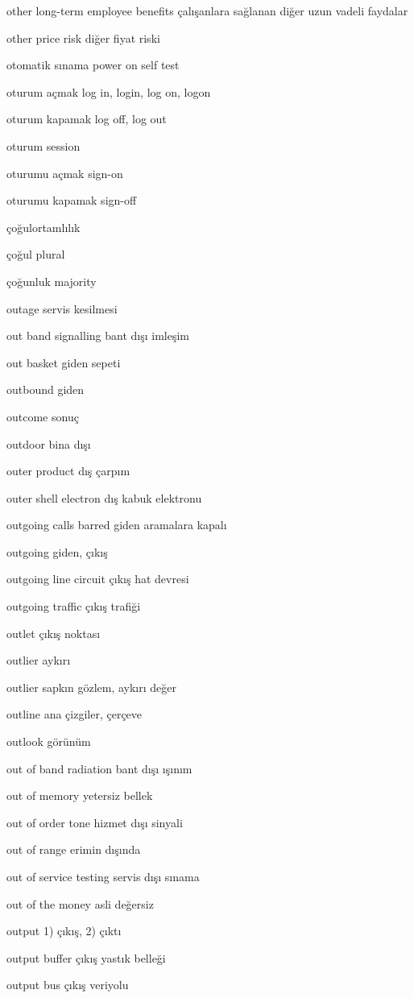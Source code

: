 \documentclass[12pt,fleqn]{article}\usepackage{../../common}
\begin{document}
other long-term employee benefits çalışanlara sağlanan diğer uzun vadeli faydalar

other price risk diğer fiyat riski

otomatik sınama power on self test

oturum açmak log in, login, log on, logon

oturum kapamak log off, log out

oturum session

oturumu açmak sign-on

oturumu kapamak sign-off

çoğulortamlılık

çoğul plural

çoğunluk majority

outage servis kesilmesi

out band signalling bant dışı imleşim

out basket giden sepeti

outbound giden

outcome sonuç

outdoor bina dışı

outer product dış çarpım

outer shell electron dış kabuk elektronu

outgoing calls barred giden aramalara kapalı

outgoing giden, çıkış

outgoing line circuit çıkış hat devresi

outgoing traffic çıkış trafiği

outlet çıkış noktası

outlier aykırı

outlier sapkın gözlem, aykırı değer

outline ana çizgiler, çerçeve

outlook görünüm

out of band radiation bant dışı ışınım

out of memory yetersiz bellek

out of order tone hizmet dışı sinyali

out of range erimin dışında

out of service testing servis dışı sınama

out of the money asli değersiz

output 1) çıkış, 2) çıktı

output buffer çıkış yastık belleği

output bus çıkış veriyolu
\end{document}
